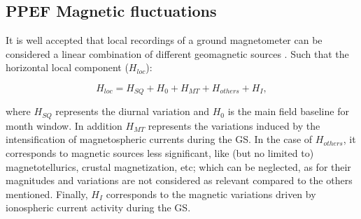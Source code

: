 \documentclass[a4paper]{article}
\theoremstyle{plain}
\theoremstyle{definition}
\begin{document}
	
	
	
	


	
	
	\subsection{PPEF Magnetic fluctuations}
	
	It is well accepted that local recordings of a ground magnetometer can be considered a linear combination of different geomagnetic sources \citep{1969intro_to_iono_p, Fukushima1973, l_handbook_geof_sw_Geom_field, baseline_Gjerloev, vanKampt}. Such that the horizontal local component ($H_{loc}$):
	
	\begin{equation}
		\label{eq:1}
		H_{loc} = H_{SQ} + H_0 + H_{MT} + H_{others} + H_{I},
	\end{equation}
	
	\noindent where $H_{SQ}$ represents the diurnal variation and $H_0$ is the main field baseline for month window. In addition $H_{MT}$ represents the variations induced by the intensification of magnetospheric currents during the GS. In the case of $H_{others}$, it corresponds to magnetic sources less significant, like (but no limited to) magnetotellurics, crustal magnetization, etc; which can be neglected, as for their magnitudes and variations are not considered as relevant compared to the others mentioned. Finally, $H_I$ \citep{ddyn2005} corresponds to the magnetic variations driven by ionospheric current activity during the GS.\\ 
	
\end{document}
